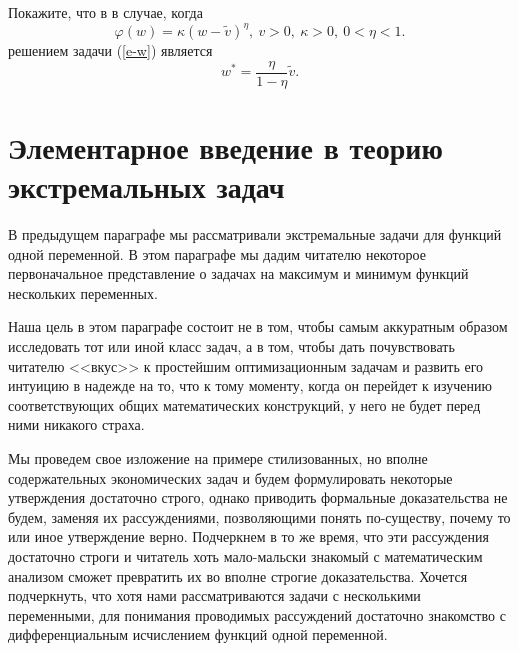 \begin{exer}
    \label{e-w-primer1}
    Покажите, что в в случае, когда
    \[\varphi(w)=\kappa(w-\tilde{v})^{\eta}, \ v>0, \ \kappa>0, \ 0<\eta<1.\]
    решением задачи (\ref{e-w}) является
    \[w^{*}=\frac{\eta}{1-\eta}\tilde{v}.\]
\end{exer}





















































\section{Элементарное введение в теорию экстремальных задач}


    В предыдущем параграфе мы рассматривали экстремальные задачи для
    функций одной переменной.
      В этом параграфе мы дадим читателю некоторое первоначальное
    представление о задачах на максимум и минимум функций нескольких
    переменных.





    Наша цель в этом параграфе состоит не в том, чтобы самым
    аккуратным образом исследовать тот или иной класс задач, а в
    том, чтобы дать почувствовать читателю <<вкус>> к простейшим
    оптимизационным задачам и развить его интуицию в надежде
    на то, что к тому моменту, когда он перейдет к изучению
    соответствующих общих математических конструкций, у него не
    будет перед ними никакого страха.

    Мы проведем свое изложение на примере стилизованных, но
    вполне содержательных экономических задач и будем формулировать
    некоторые утверждения достаточно строго,
    однако приводить формальные доказательства не будем, заменяя их
    рассуждениями, позволяющими понять по-существу, почему то или
    иное утверждение верно. Подчеркнем в то же время, что эти
    рассуждения достаточно строги и читатель хоть мало-мальски
    знакомый с математическим анализом сможет превратить их во
    вполне строгие доказательства. Хочется подчеркнуть, что хотя нами
    рассматриваются задачи с несколькими переменными, для понимания
    проводимых рассуждений достаточно знакомство с дифференциальным
    исчислением функций одной переменной.

